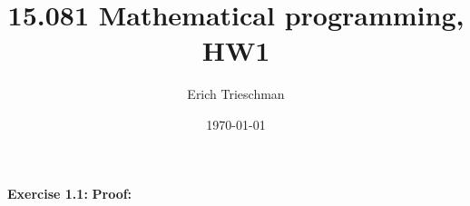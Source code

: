 \documentclass[11pt]{exam}
\title{15.081 Mathematical programming, HW1}
\author{Erich Trieschman}
\date{\today}
\begin{document}
\maketitle

\begin{questions}

  \question \textbf{Exercise 1.1:}
  \newline\newline \textbf{Proof:}

\end{questions}
\end{document}
